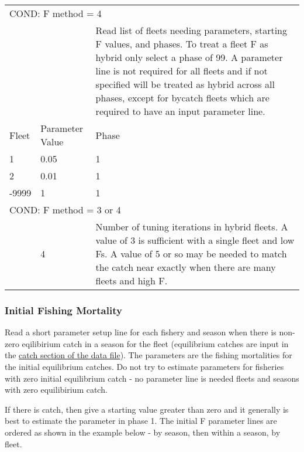 \begin{longtable}{p{1cm} p{3cm} p{11cm}}
   \multicolumn{3}{l}{COND: F method = 4}\Tstrut\\
   & & Read list of fleets needing parameters, starting F values, and phases. To treat a fleet F as hybrid only select a phase of 99. A parameter line is not required for all fleets and if not specified will be treated as hybrid across all phases, except for bycatch fleets which are required to have an input parameter line.\Tstrut\\
   Fleet & Parameter Value & Phase \Tstrut\\
   1 & 0.05 & 1 \\
   2 & 0.01 & 1 \\
   -9999 & 1  & 1 \Bstrut\\
   \hline
   
   \multicolumn{3}{l}{COND: F method = 3 or 4}\Tstrut\\
   & 4 & Number of tuning iterations in hybrid fleets. A value of 3 is sufficient with a single fleet and low Fs.  A value of 5 or so may be needed to match the catch near exactly when there are many fleets and high F. \Bstrut\\
   \hline
\end{longtable}

\hypertarget{InitF}{}
\subsubsection{Initial Fishing Mortality}
Read a short parameter setup line for each fishery and season when there is non-zero eqilibirium catch in a season for the fleet (equilibrium catches are input in the \hyperlink{CatchFormat}{catch section of the data file}). The parameters are the fishing mortalities for the initial equilibrium catches. Do not try to estimate parameters for fisheries with zero initial equilibrium catch - no parameter line is needed fleets and seasons with zero equilibirium catch.

If there is catch, then give a starting value greater than zero and it generally is best to estimate the parameter in phase 1. The initial F parameter lines are ordered as shown in the example below - by season, then within a season, by fleet.


